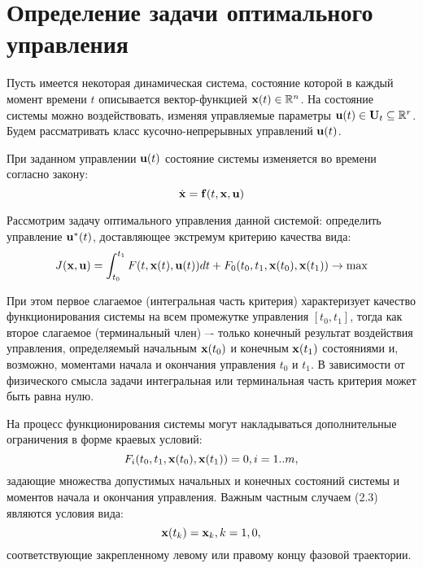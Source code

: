 \documentclass[a4paper, 12pt]{article}
\begin{document}
\section{Определение задачи оптимального управления}

Пусть имеется некоторая динамическая система, состояние которой в
каждый момент времени $t$ описывается вектор-функцией ${\bf x}(t) \in \mathbb{R}^n$. На
состояние системы можно воздействовать, изменяя управляемые параметры
${\bf u}(t) \in  {\bf U}_t \subseteq  \mathbb{R}^r$. Будем рассматривать класс кусочно-непрерывных управлений ${\bf u}(t)$.

При заданном управлении ${\bf u}(t)$ состояние системы изменяется во времени
согласно закону:
\begin{equation}
    \dot{\bf x}={\bf f}(t,{\bf x},{\bf u})
\end{equation}

Рассмотрим задачу оптимального управления данной системой:
определить управление ${\bf u}^*(t)$, доставляющее экстремум критерию качества
вида:
\begin{equation}
    J({\bf x},{\bf u})=\int_{t_0}^{t_1} F(t, {\bf x}(t), {\bf u}(t)) dt + F_0(t_0,t_1,{\bf x}(t_0),{\bf x}(t_1)) \rightarrow \max
\end{equation}

При этом первое слагаемое (интегральная часть критерия) характеризует
качество функционирования системы на всем промежутке управления $[t_0, t_1]$,
тогда как второе слагаемое (терминальный член) –- только конечный
результат воздействия управления, определяемый начальным ${\bf x}(t_0)$ и
конечным ${\bf x}(t_1)$ состояниями и, возможно, моментами начала и окончания
управления $t_0$ и $t_1$. В зависимости от физического смысла задачи
интегральная или терминальная часть критерия может быть равна нулю.

На процесс функционирования системы могут накладываться
дополнительные ограничения в форме краевых условий:
\begin{equation}
    F_i(t_0,t_1,{\bf x}(t_0),{\bf x}(t_1))=0,i=1..m,
\end{equation}
задающие множества допустимых начальных и конечных состояний системы
и моментов начала и окончания управления.
Важным частным случаем (2.3) являются условия вида:
\begin{equation}
    {\bf x}(t_k)={\bf x}_k, k=1,0 ,
\end{equation}
соответствующие закрепленному левому или правому концу фазовой
траектории.
\end{document}
